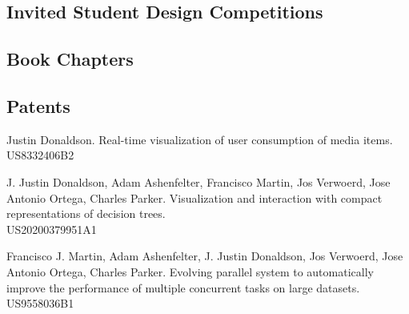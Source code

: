 \documentclass[margin,line]{res}
\let\resumesection\section
\begin{document}
\begin{resume}
\subsection{\sc Invited Student Design Competitions}

\renewcommand{\section}[2]{}
\renewcommand{\section}{\resumesection}


\subsection{\sc Book Chapters}
\renewcommand{\section}[2]{}
\renewcommand{\section}{\resumesection}

\subsection{\sc Patents}

Justin Donaldson. Real-time visualization of user consumption of media items. US8332406B2

J. Justin Donaldson, Adam Ashenfelter, Francisco Martin, Jos Verwoerd, Jose Antonio Ortega, Charles Parker. Visualization and interaction with compact representations of decision trees. \\US20200379951A1

Francisco J. Martin, Adam Ashenfelter, J. Justin Donaldson, Jos Verwoerd, Jose Antonio Ortega, Charles Parker.  Evolving parallel system to automatically improve the performance of multiple concurrent tasks on large datasets. US9558036B1


\end{resume}
\end{document}
